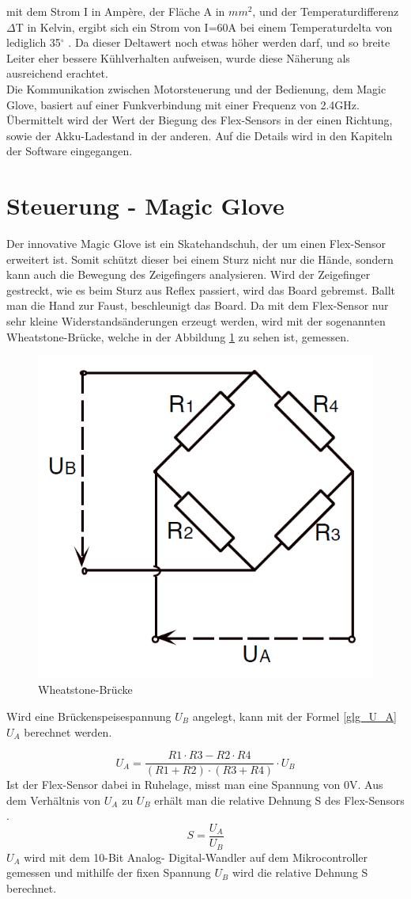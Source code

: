 mit dem Strom I in Ampère, der Fläche A in \(mm^2\), und der Temperaturdifferenz \(\Delta\)T in Kelvin,
ergibt sich ein Strom von I=60A bei einem Temperaturdelta von lediglich 35\(^\circ\) \cite{FormelStrombelastbarkeitLeiterbahn}. Da dieser Deltawert noch etwas höher werden darf, und so breite Leiter eher bessere Kühlverhalten aufweisen, wurde diese Näherung als ausreichend erachtet.
\\
Die Kommunikation zwischen Motorsteuerung und der Bedienung, dem Magic Glove, basiert auf einer Funkverbindung mit einer Frequenz von 2.4GHz. Übermittelt wird der Wert der Biegung des Flex-Sensors in der einen Richtung, sowie der Akku-Ladestand in der anderen. Auf die Details wird in den Kapiteln der Software eingegangen.


\section{Steuerung - Magic Glove}
\label{HW_MagicGlove}
Der innovative Magic Glove ist ein Skatehandschuh, der um einen Flex-Sensor erweitert ist. Somit schützt dieser bei einem Sturz nicht nur die Hände, sondern kann auch die Bewegung des Zeigefingers analysieren. Wird der Zeigefinger gestreckt, wie es beim Sturz aus Reflex passiert, wird das Board gebremst. Ballt man die Hand zur Faust, beschleunigt das Board.
Da mit dem Flex-Sensor nur sehr kleine Widerstandsänderungen erzeugt werden, wird mit der sogenannten Wheatstone-Brücke, welche in der Abbildung \ref{fig:wheatstonebruecke} zu sehen ist, gemessen.
\begin{figure} [H]
	\centering
	\includegraphics[width=.45\linewidth]{images/wheatstone_Bruecke}
	\caption{Wheatstone-Brücke}
	\label{fig:wheatstonebruecke}
\end{figure}
Wird eine Brückenspeisespannung $U_B$ angelegt, kann mit der Formel \ref{glg_U_A} $U_A$ berechnet werden\cite{Looser_Kraftmessung}. 

\begin{equation}\label{glg_U_A}
 U_A=\frac{R1 \cdot R3-R2 \cdot R4}{(R1+R2) \cdot (R3+R4)} \cdot U_B 
\end{equation}
Ist der Flex-Sensor dabei in Ruhelage, misst man eine Spannung von 0V. Aus dem Verhältnis von $ U_A $ zu $ U_B $ erhält man die relative Dehnung S des Flex-Sensors .
\begin{equation}\label{S_relativeDehnung}
S=\frac{U_A}{U_B}
\end{equation}
$U_A$ wird mit dem 10-Bit Analog- Digital-Wandler auf dem Mikrocontroller gemessen und mithilfe der fixen Spannung $U_B$ wird die relative Dehnung S berechnet. 


